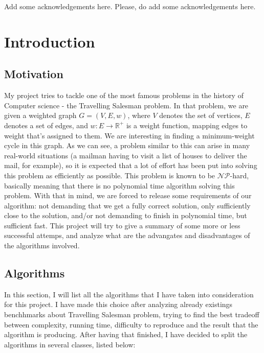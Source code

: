 \documentclass[12pt,twoside,notitlepage]{report}
\begin{document}
Add some acknowledgements here. Please, do add some acknowledgements here.


\cleardoublepage        %

\setcounter{page}{1}
\pagestyle{headings}

\chapter{Introduction}

\section{Motivation}

My project tries to tackle one of the most famous problems in the history of Computer science - the Travelling Salesman problem. In that problem, we are given a weighted graph $G = (V, E, w)$, where $V$ denotes the set of vertices, $E$ denotes a set of edges, and $w : E \rightarrow \mathbb{R^{+}}$ is a weight function, mapping edges to weight that's assigned to them. We are interesting in finding a minimum-weight cycle in this graph. As we can see, a problem similar to this can arise in many real-world situations (a mailman having to visit a list of houses to deliver the mail, for example), so it is expected that a lot of effort has been put into solving this problem as efficiently as possible. This problem is known to be $\mathcal{NP}$-hard, basically meaning that there is no polynomial time algorithm solving this problem. With that in mind, we are forced to release some requirements of our algorithm: not demanding that we get a fully correct solution, only sufficiently close to the solution, and/or not demanding to finish in polynomial time, but sufficient fast. This project will try to give a summary of some more or less successful attemps, and analyze what are the advangates and disadvantages of the algorithms involved.

\section{Algorithms}

In this section, I will list all the algorithms that I have taken into consideration for this project. I have made this choice after analyzing already existings benchhmarks about Travelling Salesman problem, trying to find the best tradeoff between complexity, running time, difficulty to reproduce and the result that the algorithm is producing. After having that finished, I have decided to split the algorithms in several classes, listed below:
\end{document}
